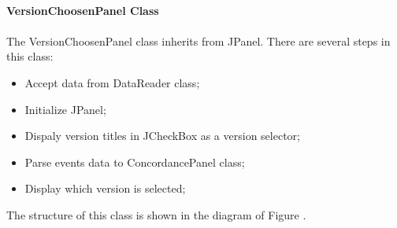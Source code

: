 \paragraph{VersionChoosenPanel Class}
\paragraph[]{}The VersionChoosenPanel class inherits from JPanel. There are several steps in this class:
\begin{itemize}
	\item \textbf{}Accept data from DataReader class;
	\item \textbf{}Initialize JPanel;
	\item \textbf{}Dispaly version titles in JCheckBox as a version selector;
	\item \textbf{}Parse events data to ConcordancePanel class;
	\item \textbf{}Display which version is selected;
\end{itemize}  
The structure of this class is shown in the diagram of Figure \label{versionChoosenPanel}.


